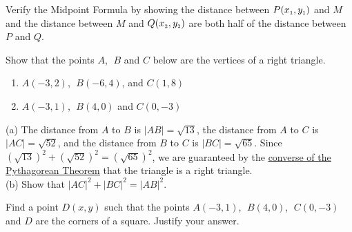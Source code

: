 \begin{enumialphparenastyle}
\begin{multicols}{2}
\begin{ex}
\begin{enumerate}
 \end{enumerate}
\begin{sol}
	
	
\end{sol}
\end{ex}

\begin{ex}
Verify the Midpoint Formula by showing the distance between $P(x_{\mbox{\tiny$1$}}, y_{\mbox{\tiny$1$}})$ and $M$ and the distance between $M$ and $Q(x_{\mbox{\tiny$2$}}, y_{\mbox{\tiny$2$}})$ are both half of the distance between $P$ and $Q$. 
\begin{sol}
	
\end{sol}
\end{ex}
	 
\begin{ex}
Show that the points $A$, $\;B$ and $C$ below are the vertices of a right triangle.
\begin{enumerate}
	
	\item  $A(-3,2)$, $\;B(-6,4)$, and $C(1,8)$
	
	\item   $A(-3, 1)$, $\;B(4, 0)$ and $C(0, -3)$
	
	
\end{enumerate}
\begin{sol}
	(a) The distance from $A$ to $B$ is $|AB| = \sqrt{13}$, the distance from $A$ to $C$ is $|AC| = \sqrt{52}$, and the distance from $B$ to $C$ is $|BC| = \sqrt{65}$.  Since $\left(\sqrt{13}\right)^2 + \left( \sqrt{52} \right)^2 = \left( \sqrt{65} \right)^2$, we are guaranteed by the \href{http://en.wikipedia.org/wiki/Pythagorean_theorem#Converse}{\underline{converse of the Pythagorean Theorem}} that the triangle is a right triangle.\\
	(b) Show that $|AC|^{2} + |BC|^{2} = |AB|^{2}$.
\end{sol}
\end{ex}
	 
 
\begin{ex}
Find a point $D(x, y)$ such that the points $A(-3, 1)$, $\;B(4, 0)$, $\;C(0, -3)$ and $D$ are the corners of a square.  Justify your answer.
\begin{sol}
	
\end{sol}
\end{ex}		
	



\end{multicols}
\end{enumialphparenastyle}
